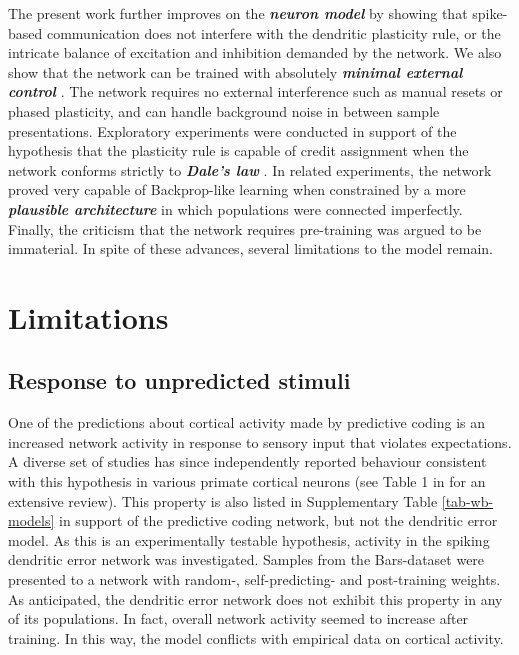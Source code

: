 The present work further improves on the \textit{\textbf{neuron model}} by showing that spike-based communication does
not interfere with the dendritic plasticity rule, or the intricate balance of excitation and inhibition demanded by the
network. We also show that the network can be trained with absolutely \textit{\textbf{minimal external control}}
\citep{Whittington2017}. The network requires no external interference such as manual resets or phased plasticity, and
can handle background noise in between sample presentations. Exploratory experiments were conducted in support of the
hypothesis that the plasticity rule is capable of credit assignment when the network conforms strictly to
\textit{\textbf{Dale's law}} \citep{Bartunov2018}. In related experiments, the network proved very capable of
Backprop-like learning when constrained by a more \textit{\textbf{plausible architecture}} \citep{Whittington2017} in
which populations were connected imperfectly. Finally, the criticism that the network requires pre-training
\citep{whittington2019theories} was argued to be immaterial. In spite of these advances, several limitations to the
model remain.





\section{Limitations}

\subsection*{Response to unpredicted stimuli}
One of the predictions about cortical activity made by predictive coding is an increased network activity in response to
sensory input that violates expectations. A diverse set of studies has since independently reported behaviour consistent
with this hypothesis in various primate cortical neurons (see Table 1 in \citep{bastos2012canonical} for an extensive
review). This property is also listed in Supplementary Table \ref{tab-wb-models} in support of the predictive coding
network, but not the dendritic error model. As this is an experimentally testable hypothesis, activity in the spiking
dendritic error network was investigated. Samples from the Bars-dataset were presented to a network with random-,
self-predicting- and post-training weights. As anticipated, the dendritic error network does not exhibit this property
in any of its populations. In fact, overall network activity seemed to increase after training. In this way, the model
conflicts with empirical data on cortical activity.


